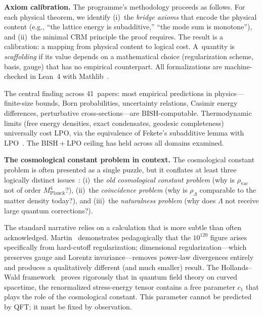 \documentclass[11pt,a4paper]{article}
\theoremstyle{plain}
\theoremstyle{definition}
\newcommand{\LPO}{\ensuremath{\mathrm{LPO}}}
\newcommand{\BISH}{\ensuremath{\mathrm{BISH}}}
\newcommand{\MPl}{M_{\mathrm{Planck}}}
\begin{document}
\medskip\noindent
\textbf{Axiom calibration.}\quad
The programme's methodology proceeds as follows.
For each physical theorem, we identify (i)~the \emph{bridge axioms}
that encode the physical content (e.g., ``the lattice energy is
subadditive,'' ``the mode sum is monotone''), and (ii)~the minimal
CRM principle the proof requires.  The result is a calibration:
a mapping from physical content to logical cost.  A~quantity is
\emph{scaffolding} if its value depends on a mathematical choice
(regularization scheme, basis, gauge) that has no empirical
counterpart.  All formalizations are machine-checked in Lean~4
with Mathlib~\cite{Lee26P10}.

The central finding across 41~papers: most empirical predictions
in physics---finite-size bounds, Born probabilities, uncertainty
relations, Casimir energy differences, perturbative cross-sections---are
$\BISH$-computable.  Thermodynamic limits (free energy densities,
exact condensates, geodesic completeness) universally cost $\LPO$,
via the equivalence of Fekete's subadditive lemma with
$\LPO$~\cite{Lee26P29}.  The $\BISH + \LPO$ ceiling has held
across all domains examined.

\medskip\noindent
\textbf{The cosmological constant problem in context.}\quad
The cosmological constant problem is often presented as a single puzzle,
but it conflates at least three logically distinct
issues~\cite{Weinberg1989,Carroll2001}:
(i)~the \emph{old cosmological constant problem} (why is
$\rho_{\mathrm{vac}}$ not of order $\MPl^4$?),
(ii)~the \emph{coincidence problem} (why is $\rho_\Lambda$ comparable
to the matter density today?), and
(iii)~the \emph{naturalness problem} (why does $\Lambda$ not receive
large quantum corrections?).

The standard narrative relies on a calculation that is more subtle
than often acknowledged.  Martin~\cite{Martin2012} demonstrates
pedagogically that the $10^{120}$ figure arises specifically from
hard-cutoff regularization; dimensional regularization---which
preserves gauge and Lorentz invariance---removes power-law
divergences entirely and produces a qualitatively different (and much
smaller) result.  The Hollands--Wald
framework~\cite{HollandsWald2001,HollandsWald2005} proves rigorously
that in quantum field theory on curved spacetime, the renormalized
stress-energy tensor contains a free parameter $c_1$ that plays the
role of the cosmological constant.  This parameter cannot be predicted
by QFT; it must be fixed by observation.
\end{document}
